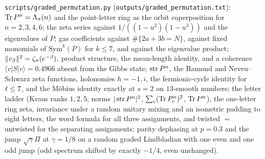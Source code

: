 \begin{numerical}
\label{num:graded-permutation}
\texttt{scripts/graded\_permutation.py} (\texttt{outputs/graded\_permutation.txt}): $\operatorname{Tr} P^n =
\Lambda_\pi(n)$ and the point-letter ring as the orbit superposition for $n = 2,3,4,6$; the
zeta series against $1/((1-u^2)(1-u^3))$ and the eigenvalues of $P$; gas coefficients against
$\#\{2a+3b = N\}$, against fixed monomials of $\mathrm{Sym}^k(P)$ for $k\le7$, and against the
eigenvalue product; $\|v_\beta\|^2 = \zeta_\pi(e^{-\beta})$, product structure, the mean-length
identity, and a coherence $\langle v|S|v\rangle = 0.4966$ absent from the Gibbs state; $\operatorname{str} P^n$,
the Ramond and Neveu--Schwarz zeta functions, holonomies $h = -1, i$, the fermionic-cycle identity
for $\ell\le7$, and the M\"obius identity exactly at $s = 2$ on $13$-smooth numbers; the letter
ladder (Kraus ranks $1,2,5$; norms $|\operatorname{str} P^n|^2$, $\sum_c(\operatorname{Tr} P_c^n)^2$, $\operatorname{Tr} P^n$), the one-letter
ring zeta, invariance under a random unitary mixing and an isometric padding to eight letters, the
word formula for all three assignments, and twisted $=$ untwisted for the separating assignments;
parity dephasing at $p = 0.3$ and the jump $\sqrt\gamma\Pi$ at $\gamma = 1/8$ on a random graded
Lindbladian with one even and one odd jump (odd spectrum shifted by exactly $-1/4$, even unchanged).
\end{numerical}
